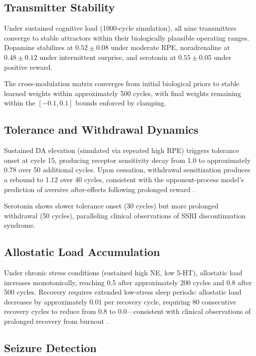 \documentclass[11pt,a4paper]{article}
\begin{document}
\subsection{Transmitter Stability}

Under sustained cognitive load (1000-cycle simulation), all nine transmitters converge to stable attractors within their biologically plausible operating ranges. Dopamine stabilizes at $0.52 \pm 0.08$ under moderate RPE, noradrenaline at $0.48 \pm 0.12$ under intermittent surprise, and serotonin at $0.55 \pm 0.05$ under positive reward.

The cross-modulation matrix converges from initial biological priors to stable learned weights within approximately 500 cycles, with final weights remaining within the $[-0.1, 0.1]$ bounds enforced by clamping.

\subsection{Tolerance and Withdrawal Dynamics}

Sustained DA elevation (simulated via repeated high RPE) triggers tolerance onset at cycle 15, producing receptor sensitivity decay from 1.0 to approximately 0.78 over 50 additional cycles. Upon cessation, withdrawal sensitization produces a rebound to 1.12 over 40 cycles, consistent with the opponent-process model's prediction of aversive after-effects following prolonged reward \citep{koob2001}.

Serotonin shows slower tolerance onset (30 cycles) but more prolonged withdrawal (50 cycles), paralleling clinical observations of SSRI discontinuation syndrome.

\subsection{Allostatic Load Accumulation}

Under chronic stress conditions (sustained high NE, low 5-HT), allostatic load increases monotonically, reaching 0.5 after approximately 200 cycles and 0.8 after 500 cycles. Recovery requires extended low-stress sleep periods: allostatic load decreases by approximately 0.01 per recovery cycle, requiring 80 consecutive recovery cycles to reduce from 0.8 to 0.0---consistent with clinical observations of prolonged recovery from burnout \citep{mcewen1998}.

\subsection{Seizure Detection}
\end{document}
